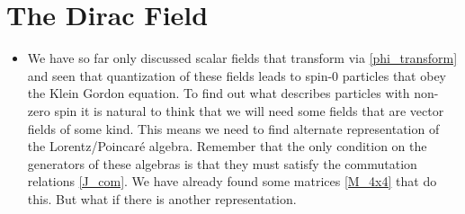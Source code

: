 \documentclass[11pt]{article}
\numberwithin{equation}{section}
\begin{document}
\section{The Dirac Field}
\begin{itemize}
  \item We have so far only discussed scalar fields that transform via \ref{phi_transform} and seen that quantization of these fields leads to spin-0 particles that obey the Klein Gordon equation. To find out what describes particles with non-zero spin it is natural to think that we will need some fields that are vector fields of some kind. This means we need to find alternate representation of the Lorentz/Poincar\'e algebra. Remember that the only condition on the generators of these algebras is that they must satisfy the commutation relations \ref{J_com}. We have already found some matrices \ref{M_4x4} that do this. But what if there is another representation.   
\end{itemize}
\end{document}
